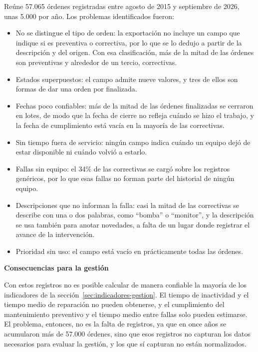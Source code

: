 \documentclass[10pt]{article}
\begin{document}
Reúne 57.065 órdenes registradas entre agosto de 2015 y septiembre de 2026, unas 5.000 por año. Los problemas identificados fueron:

\begin{itemize}
    \item No se distingue el tipo de orden: la exportación no incluye un campo que indique si es preventiva o correctiva, por lo que se lo dedujo a partir de la descripción y del origen. Con esa clasificación, más de la mitad de las órdenes son preventivas y alrededor de un tercio, correctivas.
    \item Estados superpuestos: el campo admite nueve valores, y tres de ellos son formas de dar una orden por finalizada.
    \item Fechas poco confiables: más de la mitad de las órdenes finalizadas se cerraron en lotes, de modo que la fecha de cierre no refleja cuándo se hizo el trabajo, y la fecha de cumplimiento está vacía en la mayoría de las correctivas.
    \item Sin tiempo fuera de servicio: ningún campo indica cuándo un equipo dejó de estar disponible ni cuándo volvió a estarlo.
    \item Fallas sin equipo: el 34\% de las correctivas se cargó sobre los registros genéricos, por lo que esas fallas no forman parte del historial de ningún equipo.
    \item Descripciones que no informan la falla: casi la mitad de las correctivas se describe con una o dos palabras, como “bomba” o “monitor”, y la descripción se usa también para anotar novedades, a falta de un lugar donde registrar el avance de la intervención.
    \item Prioridad sin uso: el campo está vacío en prácticamente todas las órdenes.
\end{itemize}
\textbf {Consecuencias para la gestión}

Con estos registros no es posible calcular de manera confiable la mayoría de los indicadores de la sección~\ref{sec:indicadores-gestion}. El tiempo de inactividad y el tiempo medio de reparación no pueden obtenerse, y el cumplimiento del mantenimiento preventivo y el tiempo medio entre fallas solo pueden estimarse. El problema, entonces, no es la falta de registros, ya que en once años se acumularon más de 57.000 órdenes, sino que esos registros no capturan los datos necesarios para evaluar la gestión, y los que sí capturan no están normalizados.
\end{document}
